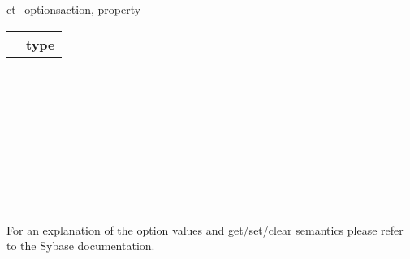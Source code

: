 \begin{methoddesc}[CS_CONNECTION]{ct_options}{action, property }
\begin{longtable}{l|l}
\var{property} & type \\
\hline
\code{CS_OPT_ANSINULL}       & \code{bool} \\
\code{CS_OPT_ANSIPERM}       & \code{bool} \\
\code{CS_OPT_ARITHABORT}     & \code{bool} \\
\code{CS_OPT_ARITHIGNORE}    & \code{bool} \\
\code{CS_OPT_CHAINXACTS}     & \code{bool} \\
\code{CS_OPT_CURCLOSEONXACT} & \code{bool} \\
\code{CS_OPT_FIPSFLAG}       & \code{bool} \\
\code{CS_OPT_FORCEPLAN}      & \code{bool} \\
\code{CS_OPT_FORMATONLY}     & \code{bool} \\
\code{CS_OPT_GETDATA}        & \code{bool} \\
\code{CS_OPT_NOCOUNT}        & \code{bool} \\
\code{CS_OPT_NOEXEC}         & \code{bool} \\
\code{CS_OPT_PARSEONLY}      & \code{bool} \\
\code{CS_OPT_QUOTED_IDENT}   & \code{bool} \\
\code{CS_OPT_RESTREES}       & \code{bool} \\
\code{CS_OPT_SHOWPLAN}       & \code{bool} \\
\code{CS_OPT_STATS_IO}       & \code{bool} \\
\code{CS_OPT_STATS_TIME}     & \code{bool} \\
\code{CS_OPT_STR_RTRUNC}     & \code{bool} \\
\code{CS_OPT_TRUNCIGNORE}    & \code{bool} \\

\code{CS_OPT_DATEFIRST}      & \code{int} \\
\code{CS_OPT_DATEFORMAT}     & \code{int} \\
\code{CS_OPT_ISOLATION}      & \code{int} \\
\code{CS_OPT_ROWCOUNT}       & \code{int} \\
\code{CS_OPT_TEXTSIZE}       & \code{int} \\

\code{CS_OPT_AUTHOFF}        & \code{string} \\
\code{CS_OPT_AUTHON}         & \code{string} \\
\code{CS_OPT_CURREAD}        & \code{string} \\
\code{CS_OPT_CURWRITE}       & \code{string} \\
\code{CS_OPT_IDENTITYOFF}    & \code{string} \\
\code{CS_OPT_IDENTITYON}     & \code{string} \\
\end{longtable}

For an explanation of the option values and get/set/clear semantics
please refer to the Sybase documentation.
\end{methoddesc}
